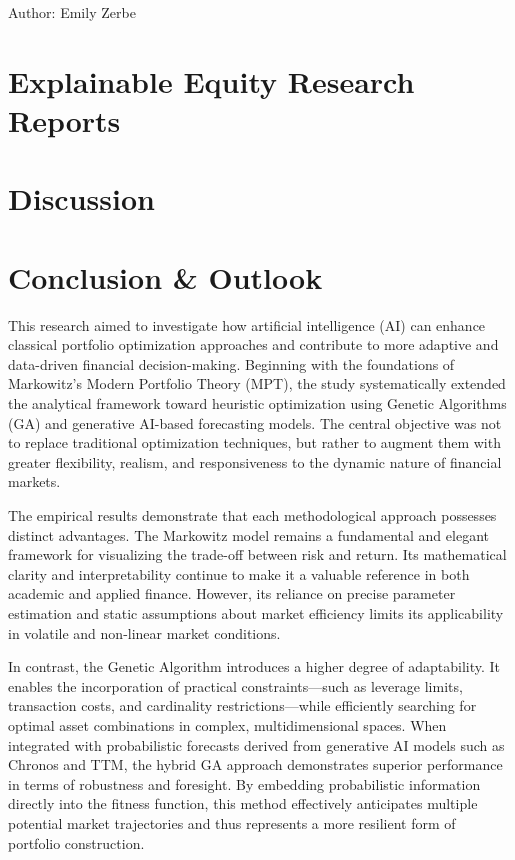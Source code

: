 \documentclass{agasthesis}
\begin{document}
Author: Emily Zerbe

\chapter{Explainable Equity Research Reports}
\chapter{Discussion}
\chapter{Conclusion & Outlook}
This research aimed to investigate how artificial intelligence (AI) can enhance classical portfolio optimization approaches and contribute to more adaptive and data-driven financial decision-making. Beginning with the foundations of Markowitz’s Modern Portfolio Theory (MPT), the study systematically extended the analytical framework toward heuristic optimization using Genetic Algorithms (GA) and generative AI-based forecasting models. The central objective was not to replace traditional optimization techniques, but rather to augment them with greater flexibility, realism, and responsiveness to the dynamic nature of financial markets. 

The empirical results demonstrate that each methodological approach possesses distinct advantages. The Markowitz model remains a fundamental and elegant framework for visualizing the trade-off between risk and return. Its mathematical clarity and interpretability continue to make it a valuable reference in both academic and applied finance. However, its reliance on precise parameter estimation and static assumptions about market efficiency limits its applicability in volatile and non-linear market conditions. 

In contrast, the Genetic Algorithm introduces a higher degree of adaptability. It enables the incorporation of practical constraints—such as leverage limits, transaction costs, and cardinality restrictions—while efficiently searching for optimal asset combinations in complex, multidimensional spaces. When integrated with probabilistic forecasts derived from generative AI models such as Chronos and TTM, the hybrid GA approach demonstrates superior performance in terms of robustness and foresight. By embedding probabilistic information directly into the fitness function, this method effectively anticipates multiple potential market trajectories and thus represents a more resilient form of portfolio construction. 
\end{document}
